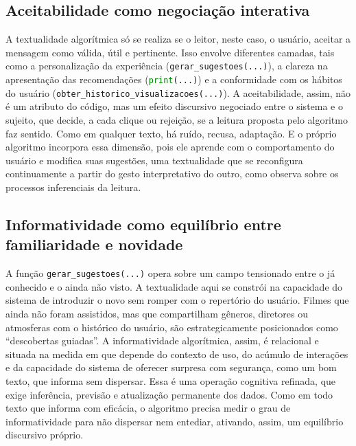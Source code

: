 \documentclass[portuguese]{textolivre}
\begin{document}
\subsection{Aceitabilidade como negociação interativa}\label{sec-titulo}
A textualidade algorítmica só se realiza se o leitor, neste caso, o usuário, aceitar a mensagem como válida, útil e pertinente. Isso envolve diferentes camadas, tais como a personalização da experiência (\lstinline[language=Python]{gerar_sugestoes(...)}), a clareza na apresentação das recomendações (\lstinline[language=Python]{print(...)}) e a conformidade com os hábitos do usuário (\lstinline[language=Python]{obter_historico_visualizacoes(...)}). A aceitabilidade, assim, não é um atributo do código, mas um efeito discursivo negociado entre o sistema e o sujeito, que decide, a cada clique ou rejeição, se a leitura proposta pelo algoritmo faz sentido. Como em qualquer texto, há ruído, recusa, adaptação. E o próprio algoritmo incorpora essa dimensão, pois ele aprende com o comportamento do usuário e modifica suas sugestões, uma textualidade que se reconfigura continuamente a partir do gesto interpretativo do outro, como observa \textcite{koch2006} sobre os processos inferenciais da leitura.

\subsection{Informatividade como equilíbrio entre familiaridade e novidade}\label{sec-autores}
A função \lstinline[language=Python]{gerar_sugestoes(...)} opera sobre um campo tensionado entre o já conhecido e o ainda não visto. A textualidade aqui se constrói na capacidade do sistema de introduzir o novo sem romper com o repertório do usuário. Filmes que ainda não foram assistidos, mas que compartilham gêneros, diretores ou atmosferas com o histórico do usuário, são estrategicamente posicionados como “descobertas guiadas”. A informatividade algorítmica, assim, é relacional e situada na medida em que depende do contexto de uso, do acúmulo de interações e da capacidade do sistema de oferecer surpresa com segurança, como um bom texto, que informa sem dispersar. Essa é uma operação cognitiva refinada, que exige inferência, previsão e atualização permanente dos dados. Como em todo texto que informa com eficácia, o algoritmo precisa medir o grau de informatividade para não dispersar nem entediar, ativando, assim, um equilíbrio discursivo próprio.
\end{document}
